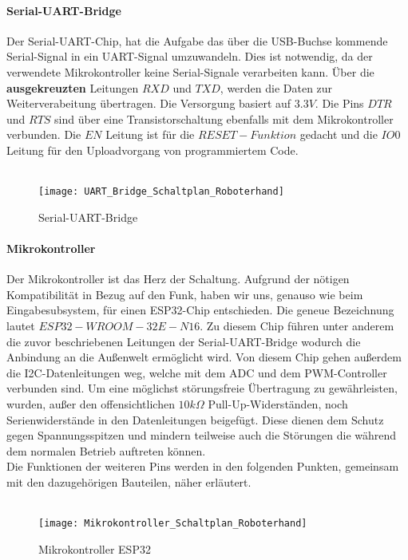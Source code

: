 \documentclass[titlepage,12pt,twoside]{article}
\begin{document}
\paragraph{Serial-UART-Bridge}
\hfill \break
\hfill \break
Der Serial-UART-Chip, hat die Aufgabe das über die USB-Buchse kommende Serial-Signal in ein UART-Signal umzuwandeln.
Dies ist notwendig, da der verwendete Mikrokontroller keine Serial-Signale verarbeiten kann. Über die \textbf{ausgekreuzten}
Leitungen $RXD$ und $TXD$, werden die Daten zur Weiterverabeitung übertragen. Die Versorgung basiert auf $3.3V$. Die Pins
$DTR$ und $RTS$ sind über eine Transistorschaltung ebenfalls mit dem Mikrokontroller verbunden. Die $EN$ Leitung ist für 
die $RESET-Funktion$ gedacht und die $IO0$ Leitung für den Uploadvorgang von programmiertem Code. \\
\\
\begin{figure}[H]
	\begin{center}
		\scalebox{1.0}
		{\texttt{[image: UART\_Bridge\_Schaltplan\_Roboterhand]}}
		\caption{Serial-UART-Bridge}
		\label{fig:UART_Bridge_Schaltplan_Roboterhand}	
	\end{center}
\end{figure}
\hfill \break

\paragraph{Mikrokontroller}
\hfill \break
\hfill \break
Der Mikrokontroller ist das Herz der Schaltung. Aufgrund der nötigen Kompatibilität in Bezug auf den Funk, haben wir uns, genauso wie beim Eingabesubsystem, für einen ESP32-Chip entschieden.
Die geneue Bezeichnung lautet $ESP32-WROOM-32E-N16$. Zu diesem Chip führen unter anderem die zuvor beschriebenen Leitungen der Serial-UART-Bridge wodurch die Anbindung an die Außenwelt ermöglicht 
wird. Von diesem Chip gehen außerdem die I2C-Datenleitungen weg, welche mit dem ADC und dem PWM-Controller verbunden sind. Um eine möglichst störungsfreie Übertragung zu gewährleisten, wurden, außer 
den offensichtlichen $10k\Omega$ Pull-Up-Widerständen, noch Serienwiderstände in den Datenleitungen beigefügt. Diese dienen dem Schutz gegen Spannungsspitzen und mindern teilweise auch die Störungen
die während dem normalen Betrieb auftreten können. \\
Die Funktionen der weiteren Pins werden in den folgenden Punkten, gemeinsam mit den dazugehörigen Bauteilen, näher erläutert. \\
\\
\begin{figure}[H]
	\begin{center}
		\scalebox{1.0}
		{\texttt{[image: Mikrokontroller\_Schaltplan\_Roboterhand]}}
		\caption{Mikrokontroller ESP32}
		\label{fig:Mikrokontroller_Schaltplan_Roboterhand}	
	\end{center}
\end{figure}
\hfill \break
\end{document}
